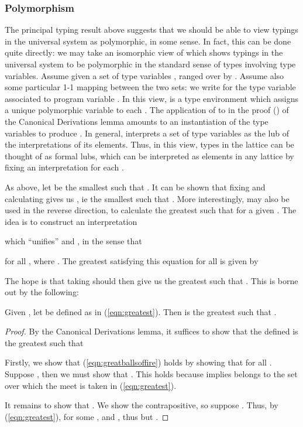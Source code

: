 \documentclass{sigplanconf}
\begin{document}
\begin{table}
\subsubsection{Polymorphism}\label{sect:polymorphism}
The principal typing result above suggests that we should be able to view
typings in the universal system as polymorphic, in some sense.
In fact, this can be done quite directly:
we may take an isomorphic view of 
which shows typings in the universal system to be polymorphic in the standard
sense of types involving type variables.
Assume given a set of type variables , ranged over by .
Assume also some particular 1-1 mapping between the two sets: we write
 for the type variable associated to program variable .
In this view,  is a type environment which assigns a unique polymorphic
variable  to each .
The application of  to  in the proof
() of the Canonical Derivations lemma amounts to an
instantiation of the type variables to produce .
In general,  interprets a set  of type
variables as the lub of the interpretations of its elements.
Thus, in this view, types in the  lattice can be thought
of as formal lubs, which can be interpreted as elements in any lattice
 by fixing an interpretation  for each .

As above, let
 be the smallest  such that .
It can be shown that fixing  and calculating
 gives us
, ie
the smallest
 such that .
More interestingly,  may also be used
in the reverse direction,
to calculate the greatest  such that 
for a given .
The idea is to construct an interpretation

which ``unifies''  and , in the sense that

for all , where .
The greatest  satisfying this equation for all  is given by

The hope is that taking  should then
give us the greatest  such that .
This is borne out by the following:
\begin{proposition}
Given ,
let  be defined as in (\ref{eqn:greatest}).
Then  is the greatest  such that .
\end{proposition}
\begin{proof}
By the Canonical Derivations lemma, it suffices to show that the 
defined is the greatest such that

Firstly, we show that (\ref{eqn:greatballsoffire}) holds by showing that
 for all .
Suppose , then we must show that
. This holds because
 implies  belongs to the set
over which the meet is taken in (\ref{eqn:greatest}).

It remains to show
that .
We show the contrapositive,
so suppose . Thus, by (\ref{eqn:greatest}),
for some ,  and ,
thus  but .
\end{proof}


\end{table}
\end{document}
